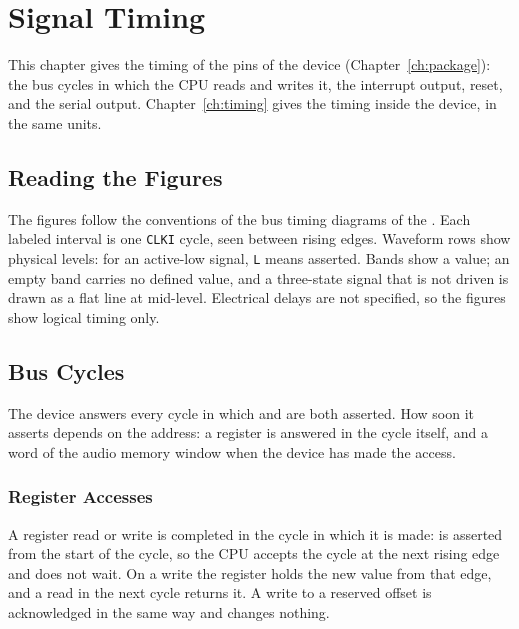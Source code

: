 \chapter{Signal Timing}
\label{ch:signal-timing}

This chapter gives the timing of the pins of the device (Chapter~\ref{ch:package}): the bus cycles in which the CPU
reads and writes it, the interrupt output, reset, and the serial output. Chapter~\ref{ch:timing} gives the timing
inside the device, in the same units.

\section{Reading the Figures}

The figures follow the conventions of the bus timing diagrams of the \hwmanual{}. Each labeled interval is one
\texttt{CLKI} cycle, seen between rising edges. Waveform rows show physical levels: for an active-low signal,
\texttt{L} means asserted. Bands show a value; an empty band carries no defined value, and a three-state signal that is
not driven is drawn as a flat line at mid-level. Electrical delays are not specified, so the figures show logical
timing only.

\section{Bus Cycles}
\label{sec:signal-bus}

The device answers every cycle in which  and  are both asserted. How soon it asserts
 depends on the address: a register is answered in the cycle itself, and a word of the audio memory
window when the device has made the access.

\subsection{Register Accesses}

A register read or write is completed in the cycle in which it is made:  is asserted from the start of
the cycle, so the CPU accepts the cycle at the next rising edge and does not wait. On a write the register holds the
new value from that edge, and a read in the next cycle returns it. A write to a reserved offset is acknowledged in the
same way and changes nothing.

